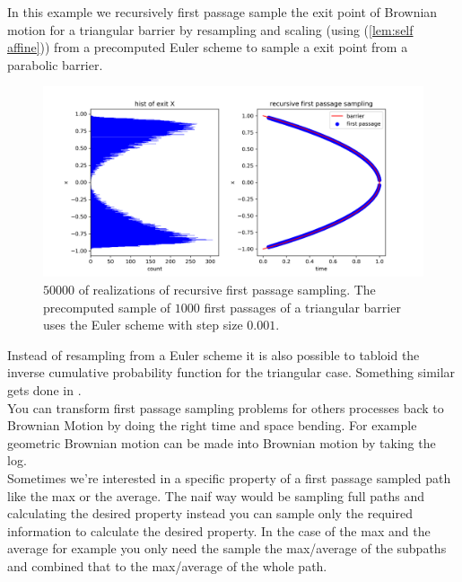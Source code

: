 \documentclass[a4paper,12pt]{article}
\begin{document}
\begin{example} \label{ex:recursive first passage sampling}
    In this example we recursively first passage sample the exit point of Brownian motion
    for a triangular barrier by resampling and scaling (using (\ref{lem:self affine})) from
    a precomputed Euler scheme to sample a exit point from a parabolic barrier.
    \begin{figure}[ht!]
        \centering
        \includegraphics[width=1\textwidth]{plots/recursive first passage para.png}
        \caption{ $50000$ of realizations of recursive first passage sampling.
            The precomputed sample of $1000$ first passages of a triangular barrier
            uses the Euler scheme with step size $0.001$.}
        \label{fig:recursive first passage para}
    \end{figure}
\end{example}

Instead of resampling from a Euler scheme it is also possible
to tabloid the inverse cumulative probability function for the
triangular case. Something similar gets done in \cite{hwang_simulationtabulation_2001}. \\


You can transform first passage sampling problems for others processes back to
Brownian Motion by doing the right time and space bending. For example geometric
Brownian motion can be made into Brownian motion by taking the log. \\


Sometimes we're interested in a specific property of a first passage sampled
path like the max or the average. The naif way would be sampling full paths
and calculating the desired property instead you can sample only the required
information to calculate the desired property. In the case of the max
and the average for example you only need the sample the max/average
of the subpaths and combined that to the max/average of the whole path.\\
\end{document}
